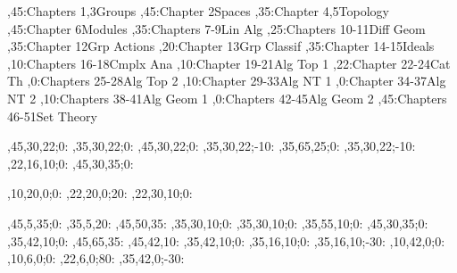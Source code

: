 
\setcounter{diagheight}{50}
\begin{chart}
,45:{Chapters 1,3}{Groups}{}
,45:{Chapter 2}{Spaces}{}
,35:{Chapter 4,5}{Topology}{}
,45:{Chapter 6}{Modules}{}
,35:{Chapters 7-9}{Lin Alg}{}
,25:{Chapters 10-11}{Diff Geom}{}
,35:{Chapter 12}{Grp Actions}{}
,20:{Chapter 13}{Grp Classif}{}
,35:{Chapter 14-15}{Ideals}{}
,10:{Chapters 16-18}{Cmplx Ana}{}
,10:{Chapter 19-21}{Alg Top 1}{}
,22:{Chapter 22-24}{Cat Th}{}
,0:{Chapters 25-28}{Alg Top 2}{}
,10:{Chapter 29-33}{Alg NT 1}{}
,0:{Chapter 34-37}{Alg NT 2}{}
,10:{Chapters 38-41}{Alg Geom 1}{}
,0:{Chapters 42-45}{Alg Geom 2}{}
,45:{Chapters 46-51}{Set Theory}{}

,45,30,22;0:   %
,35,30,22;0:   %
,45,30,22;0:   %
,35,30,22;-10: %
,35,65,25;0:   %
,35,30,22;-10: %
,22,16,10;0:   %
,45,30,35;0:   %

,10,20,0;0:    %
,22,20,0;20:   %
,22,30,10;0:   %

,45,5,35;0:    %
,35,5,20:      %
,45,50,35:     %
,35,30,10;0:   %
,35,30,10;0:   %
,35,55,10;0:   %
,45,30,35;0:   %
,35,42,10;0:   %
,45,65,35:     %
,45,42,10:     %
,35,42,10;0:   %
,35,16,10;0:   %
,35,16,10;-30: %
,10,42,0;0:    %
,10,6,0;0:     %
,22,6,0;80:     %
,35,42,0;-30:  %
\end{chart}
